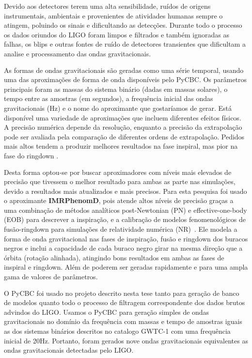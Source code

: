 Devido aos detectores terem uma alta sensibilidade, ruídos de origens instrumentais, ambientais e provenientes de atividades humanas sempre o atingem, poluindo os sinais e dificultando as detecções. Durante todo o processo os dados oriundos do LIGO foram limpos e filtrados e também ignoradas as falhas, os blips e outras fontes de ruído de detectores transientes que dificultam a analise e processamento das ondas gravitacionais.

As formas de ondas gravitacionais são geradas como uma série temporal, usando uma das aproximações de forma de onda disponíveis pelo PyCBC. Os parâmetros principais foram as massas do sistema binário (dadas em massas solares), o tempo entre as amostras (em segundos), a frequência inicial das ondas gravitacionais (Hz) e o nome do aproximante que gostaríamos de gerar. Está disponível uma variedade de aproximações que incluem diferentes efeitos físicos. A precisão numérica depende da resolução, enquanto a precisão da extrapolação pode ser avaliada pela comparação de diferentes ordens de extrapolação. Pedidos mais altos tendem a produzir melhores resultados na fase inspiral, mas pior na fase do ringdown \cite{scharpf2017simulation}. 

Desta forma optou-se por buscar aproximadores com níveis mais elevados de precisão que tivessem o melhor resultado para ambas as parte nas simulações, devido a resultados mais atualizados e mais precisos. Para esta pesquisa foi usado o aproximante \textbf{IMRPhenomD}, pois atende altos níveis de precisão graças a uma combinação de métodos analíticos post-Newtonian (PN) e effective-one-body (EOB) para descrever a inspiração, e a calibração de modelos fenomenológicos de fusão-ringdown para simulações de relatividade numérica (NR)~\cite{khan2015frequencydomain}. Ele modela a forma de onda gravitacional nas fases de inspiração, fusão e ringdown dos buracos negros e inclui a capacidade de cada buraco negro girar na mesma direção que a órbita (rotação alinhada), atingindo bons resultados em ambas as fases de inspiral e ringdown. Além de poderem ser geradas rapidamente e para uma ampla gama de valores de parâmetros.

O PyCBC foi usado no projeto descrito nesta tese tanto para geração de banco de modelos quanto todo o processo de filtragem correspondente dos dados brutos advindos do LIGO. Usamos o PyCBC para geração simples de ondas gravitacionais no domínio da frequência com massas e tempo de amostras iguais as dos sistemas binários descritos no catalogo GWTC-1 com uma frequência inicial de 20Hz. Portanto, foram gerados nove ondas gravitacionais equivalentes as ondas gravitacionais detectadas pelo LIGO.

